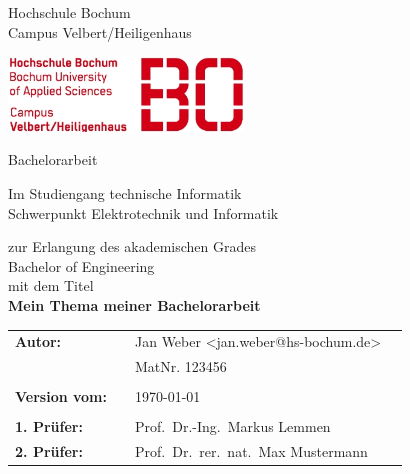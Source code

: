 \thispagestyle{empty}

\begin{minipage}[b]{0.7\textwidth}
\begin{center}
    {{Hochschule Bochum \\ Campus Velbert/Heiligenhaus}\par}
    \vspace{1.5ex}
    {{}\par}
\end{center}
\end{minipage}
\strut\hfill
  \includegraphics[height=2cm]{bilder/bologo}
  
\vspace*{2.5cm}
  \begin{center}
    \vspace{1.0cm}
    {\huge%
	{Bachelorarbeit}\par}
    {\Large{Im Studiengang technische Informatik \\Schwerpunkt Elektrotechnik und Informatik}\par}
    {\Large zur Erlangung des akademischen Grades \\ Bachelor of Engineering\\[\medskipamount]}
	mit dem Titel\\
	\vspace*{2ex}
	\Huge{\textbf{Mein Thema meiner Bachelorarbeit}}
  \end{center}
  \vfill
 

\begin{flushleft}
\begin{tabular}{llll}
\textbf{Autor:} & & Jan Weber <jan.weber@hs-bochum.de>& \\
& & MatNr. 123456 & \\
& & \\
\textbf{Version vom:} & & \today &\\
& & \\
\textbf{1. Prüfer:} & & Prof.~Dr.-Ing.~Markus Lemmen&\\%
\textbf{2. Prüfer:} & & Prof.~Dr.~rer.~nat.~Max Mustermann&\\%
\end{tabular}
\end{flushleft}
